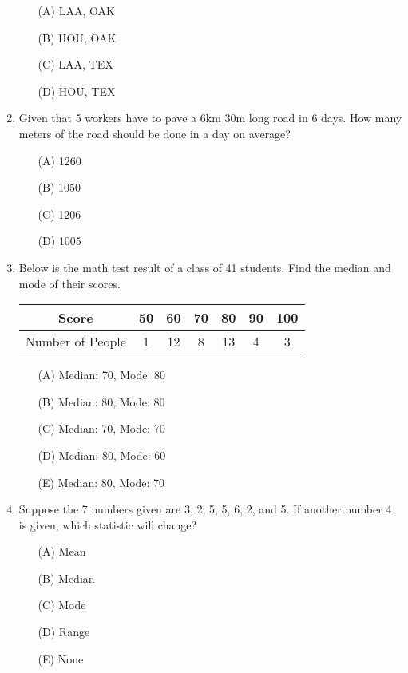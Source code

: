 \documentclass[11pt]{scrartcl}
\begin{document}
\begin{enumerate}
    \begin{enumerate}
        \item[(A)] LAA, OAK
        \item[(B)] HOU, OAK
        \item[(C)] LAA, TEX
        \item[(D)] HOU, TEX
    \end{enumerate}
    \vspace{4\baselineskip}


    \item Given that 5 workers have to pave a 6km 30m long road in 6 days. How many meters of the road should be done in a day on average?
    \begin{enumerate}
        \item[(A)] 1260
        \item[(B)] 1050
        \item[(C)] 1206
        \item[(D)] 1005
    \end{enumerate}
    \vspace{4\baselineskip}


\item Below is the math test result of a class of 41 students. Find the median and mode of their scores.\\
\begin{tabular}{c|cccccc}
\hline
Score & 50 & 60 & 70 & 80 & 90 & 100\\
\hline
Number of People & 1 & 12 & 8 & 13 & 4 & 3\\
\hline
\end{tabular}
\begin{enumerate}
\item[(A)] Median: 70, Mode: 80
\item[(B)] Median: 80, Mode: 80
\item[(C)] Median: 70, Mode: 70
\item[(D)] Median: 80, Mode: 60
\item[(E)] Median: 80, Mode: 70
\end{enumerate}
\vspace{4\baselineskip}

\item Suppose the 7 numbers given are 3, 2, 5, 5, 6, 2, and 5. If another number 4 is given, which statistic will change?
\begin{enumerate}
\item[(A)] Mean
\item[(B)] Median
\item[(C)] Mode
\item[(D)] Range
\item[(E)] None
\end{enumerate}

	\end{enumerate}
\end{document}
